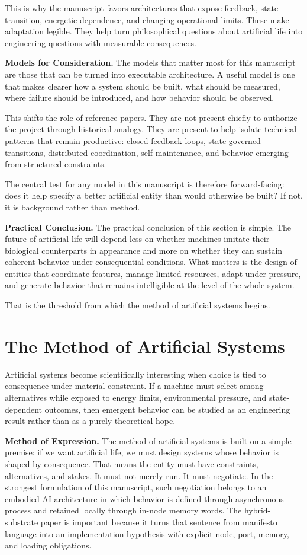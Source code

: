 \documentclass[a4paper,english]{article}
\begin{document}
This is why the manuscript favors architectures that expose feedback,
state transition, energetic dependence, and changing operational limits.
These make adaptation legible. They help turn philosophical questions
about artificial life into engineering questions with measurable consequences.

\textbf{Models for Consideration.} The models that matter most for this manuscript are those that can
be turned into executable architecture. A useful model is one that
makes clearer how a system should be built, what should be measured,
where failure should be introduced, and how behavior should be observed.

This shifts the role of reference papers. They are not present chiefly
to authorize the project through historical analogy. They are present
to help isolate technical patterns that remain productive: closed
feedback loops, state-governed transitions, distributed coordination,
self-maintenance, and behavior emerging from structured constraints.

The central test for any model in this manuscript is therefore forward-facing:
does it help specify a better artificial entity than would otherwise
be built? If not, it is background rather than method.

\textbf{Practical Conclusion.} The practical conclusion of this section is simple. The future of
artificial life will depend less on whether machines imitate their
biological counterparts in appearance and more on whether they can
sustain coherent behavior under consequential conditions. What matters
is the design of entities that coordinate features, manage limited
resources, adapt under pressure, and generate behavior that remains
intelligible at the level of the whole system.

That is the threshold from which the method of artificial systems
begins.

\section{The Method of Artificial Systems}

Artificial systems become scientifically interesting when choice is
tied to consequence under material constraint. If a machine must select
among alternatives while exposed to energy limits, environmental pressure,
and state-dependent outcomes, then emergent behavior can be studied
as an engineering result rather than as a purely theoretical hope.

\textbf{Method of Expression.} The method of artificial systems is built on a simple premise: if
we want artificial life, we must design systems whose behavior is
shaped by consequence. That means the entity must have constraints,
alternatives, and stakes. It must not merely run. It must negotiate.
In the strongest formulation of this manuscript, such negotiation belongs
to an embodied AI architecture in which behavior is defined through
asynchronous process and retained locally through in-node memory words.
The hybrid-substrate paper is important because it turns that sentence
from manifesto language into an implementation hypothesis with explicit
node, port, memory, and loading obligations.
\end{document}
